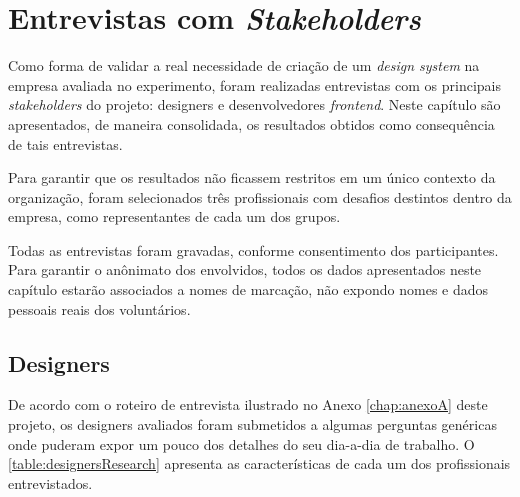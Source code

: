 
\chapter{Entrevistas com \textit{Stakeholders}}
\label{chap:entrevistas}


Como forma de validar a real necessidade de criação de um \textit{design system} na empresa avaliada no experimento, foram realizadas entrevistas com os principais \textit{stakeholders} do projeto: designers e desenvolvedores \textit{frontend}. Neste capítulo são apresentados, de maneira consolidada, os resultados obtidos como consequência de tais entrevistas.

Para garantir que os resultados não ficassem restritos em um único contexto da organização, foram selecionados três profissionais com desafios destintos dentro da empresa, como representantes de cada um dos grupos.

Todas as entrevistas foram gravadas, conforme consentimento dos participantes. Para garantir o anônimato dos envolvidos, todos os dados apresentados neste capítulo estarão associados a nomes de marcação, não expondo nomes e dados pessoais reais dos voluntários.

\section{Designers}
\label{sec:entrevistasDesigners}

De acordo com o roteiro de entrevista ilustrado no Anexo \ref{chap:anexoA} deste projeto, os designers avaliados foram submetidos a algumas perguntas genéricas onde puderam expor um pouco dos detalhes do seu dia-a-dia de trabalho. O \autoref{table:designersResearch} apresenta as características de cada um dos profissionais entrevistados.

